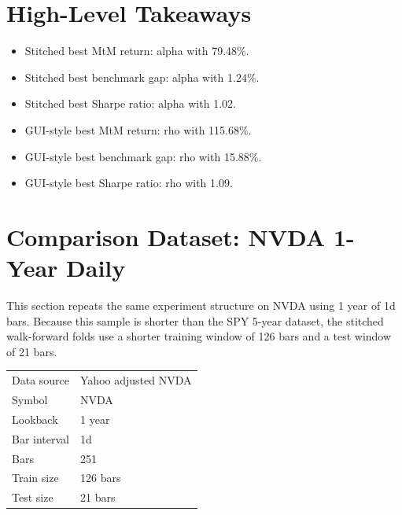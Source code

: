 \documentclass[10pt]{article}
\begin{document}
\section*{High-Level Takeaways}
\begin{itemize}
    \item Stitched best MtM return: alpha with 79.48\%.
    \item Stitched best benchmark gap: alpha with 1.24\%.
    \item Stitched best Sharpe ratio: alpha with 1.02.
    \item GUI-style best MtM return: rho with 115.68\%.
    \item GUI-style best benchmark gap: rho with 15.88\%.
    \item GUI-style best Sharpe ratio: rho with 1.09.
\end{itemize}


\section*{Comparison Dataset: NVDA 1-Year Daily}
This section repeats the same experiment structure on NVDA
using 1 year of 1d bars.
Because this sample is shorter than the SPY 5-year dataset, the stitched
walk-forward folds use a shorter training window of 126 bars and a
test window of 21 bars.

\begin{tabular}{ll}
\toprule
Data source & Yahoo adjusted NVDA \\
Symbol & NVDA \\
Lookback & 1 year \\
Bar interval & 1d \\
Bars & 251 \\
Train size & 126 bars \\
Test size & 21 bars \\
\bottomrule
\end{tabular}
\end{document}
